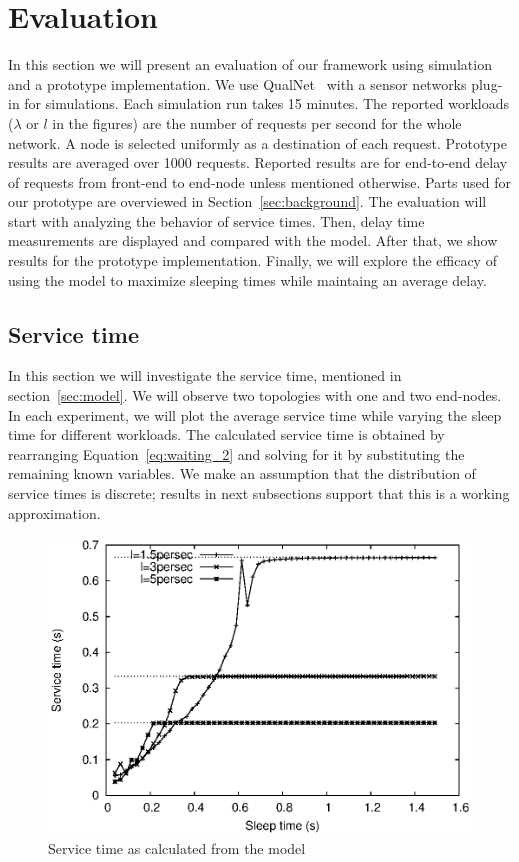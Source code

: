 \section{Evaluation}

In this section we will present an evaluation of our framework using simulation and a prototype implementation. We use QualNet~\cite{16} with a sensor networks plug-in for simulations. Each simulation run takes 15 minutes. The reported workloads ($\lambda$ or $l$ in the figures) are the number of requests per second for the whole network. A node is selected uniformly as a destination of each request. Prototype results are averaged over 1000 requests. Reported results are for end-to-end delay of requests from front-end to end-node unless mentioned otherwise. Parts used for our prototype are overviewed in Section~\ref{sec:background}. The evaluation will start with analyzing the behavior of service times. Then, delay time measurements are displayed and compared with the model. After that, we show results for the prototype implementation. Finally, we will explore the efficacy of using the model to maximize sleeping times while maintaing an average delay.

\subsection{Service time}
In this section we will investigate the service time, mentioned in section~\ref{sec:model}. We will observe two topologies with one and two end-nodes. In each experiment, we will plot the average service time while varying the sleep time for different workloads. The calculated service time is obtained by rearranging Equation~\ref{eq:waiting_2} and solving for it by substituting the remaining known variables. We make an assumption that the distribution of service times is discrete; results in next subsections support that this is a working approximation. 

\begin{figure}[t]
\centering
\includegraphics[scale=0.65]{figures/3node_varySleep_sim_x.eps}
\caption{Service time as calculated from the model}
\label{fig:3nodes_x}
\end{figure}

